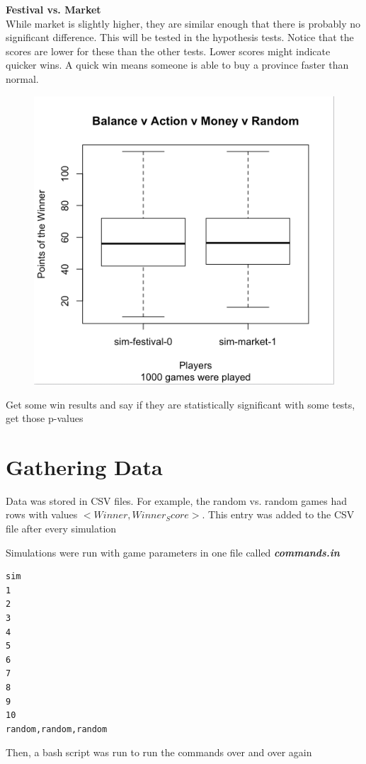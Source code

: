 \documentclass[11pt, oneside]{article}   	%
\begin{document}
\textbf{Festival vs. Market}\\

While market is slightly higher, they are similar enough that there is probably no significant difference. This will be tested in the hypothesis tests. Notice that the scores are lower for these than the other tests. Lower scores might indicate quicker wins. A quick win means someone is able to buy a province faster than normal. 

\begin{figure}[H]
\includegraphics[width=.75\textwidth]{festival_market}
\centering
\end{figure}


Get some win results and say if they are statistically significant with some tests, get those p-values

\section{Gathering Data}

Data was stored in CSV files. For example, the random vs. random games had rows with values  $<Winner, Winner_Score>$. This entry was added to the CSV file after every simulation

Simulations were run with game parameters in one file called \textbf{\textit{commands.in}}

\begin{verbatim}
sim
1
2
3
4
5
6
7
8
9
10
random,random,random
\end{verbatim}

Then, a bash script was run to run the commands over and over again
\end{document}

